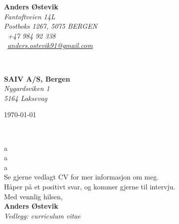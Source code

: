 \documentclass[11pt, norsk]{article}
\begin{document}
\sffamily   %
\hfill%
\begin{minipage}[t]{.6\textwidth}
\raggedleft%
{\bfseries Anders Østevik}\\[.35ex]
\small\itshape%
Fantoftveien 14L\\
Postboks 1267, 5075 BERGEN\\[.35ex]
\Telefon~+47 984 92 338\\
\Letter~\href{mailto:anders.ostevik91@gmail.com}{anders.ostevik91@gmail.com}
\end{minipage}\\[1em]
%
\begin{minipage}[t]{.4\textwidth}
\raggedright%
{\bfseries SAIV A/S, Bergen}\\[.35ex]
\small\itshape%
Nygardsviken 1\\
5164 Laksevag
\end{minipage}
\hfill %
\begin{minipage}[t]{.4\textwidth}
\raggedleft %
\today
\end{minipage}\\[2em]
\raggedright

a\\[1.5em]

a\\[1.0em]

a\\[1.5em]

Se gjerne vedlagt CV for mer informasjon om meg.\\[1.5em]

Håper på et positivt svar, og kommer gjerne til intervju.\\[3em]

Med vennlig hilsen,\\[2em] %
%
{\bfseries Anders Østevik}\\
%
\vfill%
{\slshape Vedlegg: curriculum vitae{}}

\newpage


\end{document}
